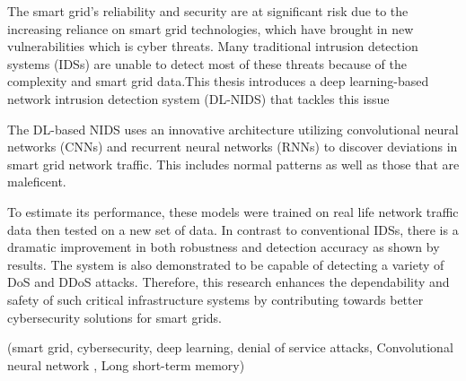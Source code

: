 \begin{abstractEn}
	

	The smart grid's reliability and security are at significant risk due to the increasing reliance on smart grid technologies, which have brought in new vulnerabilities which is cyber threats. Many traditional intrusion detection systems (IDSs) are unable to detect most of these threats because of the complexity and smart grid data.This thesis introduces a deep learning-based network intrusion detection system (DL-NIDS) that tackles this issue

	The DL-based NIDS uses an innovative architecture utilizing convolutional neural networks (CNNs) and recurrent neural networks (RNNs) to discover deviations in smart grid network traffic. This includes normal patterns as well as those that are maleficent.

	To estimate its performance, these models were trained on real life network traffic data then tested on a new set of data. In contrast to conventional IDSs, there is a dramatic improvement in both robustness and detection accuracy as shown by results. The system is also demonstrated to be capable of detecting a variety of DoS and DDoS attacks. Therefore, this research enhances the dependability and safety of such critical infrastructure systems by contributing towards better cybersecurity solutions for smart grids.


\end{abstractEn}

\begin{keywordsEn}
	(smart grid, cybersecurity, deep learning, denial of service attacks, Convolutional neural network , Long short-term memory)
\end{keywordsEn}



\newpage
